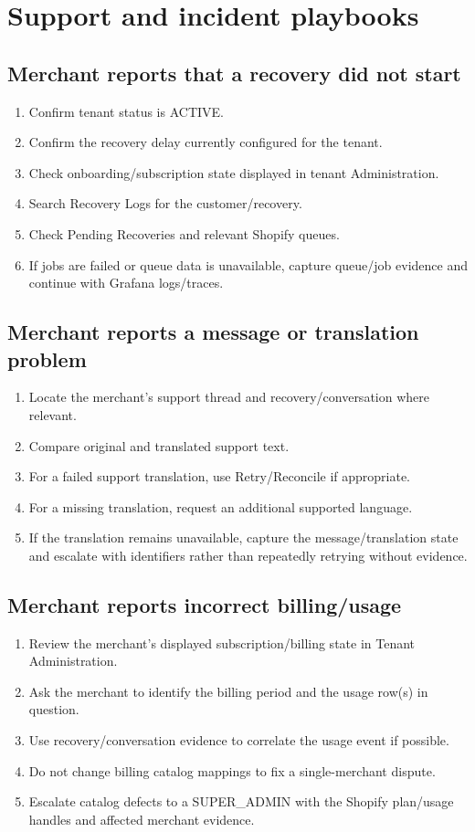 \chapter{Support and incident playbooks}

\section{Merchant reports that a recovery did not start}
\begin{enumerate}
  \item Confirm tenant status is ACTIVE.
  \item Confirm the recovery delay currently configured for the tenant.
  \item Check onboarding/subscription state displayed in tenant Administration.
  \item Search Recovery Logs for the customer/recovery.
  \item Check Pending Recoveries and relevant Shopify queues.
  \item If jobs are failed or queue data is unavailable, capture queue/job evidence and continue with Grafana logs/traces.
\end{enumerate}

\section{Merchant reports a message or translation problem}
\begin{enumerate}
  \item Locate the merchant's support thread and recovery/conversation where relevant.
  \item Compare original and translated support text.
  \item For a failed support translation, use Retry/Reconcile if appropriate.
  \item For a missing translation, request an additional supported language.
  \item If the translation remains unavailable, capture the message/translation state and escalate with identifiers rather than repeatedly retrying without evidence.
\end{enumerate}

\section{Merchant reports incorrect billing/usage}
\begin{enumerate}
  \item Review the merchant's displayed subscription/billing state in Tenant Administration.
  \item Ask the merchant to identify the billing period and the usage row(s) in question.
  \item Use recovery/conversation evidence to correlate the usage event if possible.
  \item Do not change billing catalog mappings to fix a single-merchant dispute.
  \item Escalate catalog defects to a SUPER\_ADMIN with the Shopify plan/usage handles and affected merchant evidence.
\end{enumerate}


